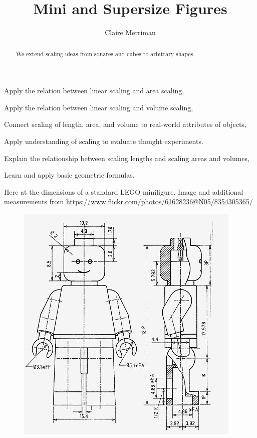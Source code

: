 \documentclass[handout,nooutcomes,noauthor,hints]{../ximera}
\title{Mini and Supersize Figures}
\author{Claire Merriman}
\begin{document}
\begin{abstract}
  We extend scaling ideas from squares and cubes to arbitrary shapes.
\end{abstract}
\maketitle

\begin{listOutcomes}
\item Apply the relation between linear scaling and area scaling,
\item Apply the relation between linear scaling and volume scaling,
\item Connect scaling of length, area, and volume to real-world attributes of objects,
\item Apply understanding of scaling to evaluate thought experiments.
\end{listOutcomes}

\begin{listObjectives}
 \item Explain the relationship between scaling lengths and scaling areas and volumes,
\item Learn and apply basic geometric formulas.
\end{listObjectives}

Here at the dimensions of a standard LEGO minifigure. Image and additional measurements from \url{https://www.flickr.com/photos/61628236@N05/8354305365/}

\begin{figure}[h]
\begin{center}
 \includegraphics[height=.55\textheight]{lego-minifigure.jpeg}

\end{center}
\end{figure}
\end{document}

